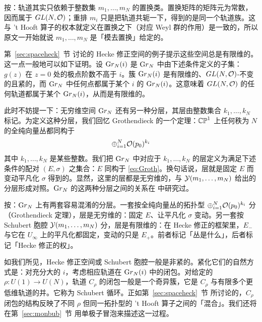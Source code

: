 \begin{yizhu}[易错点]
按：轨道其实只依赖于整数集 $m_1,\ldots,m_N$ 的置换类。置换矩阵的矩阵元为常数，因而属于 $GL(N,\cO)$；重排 $m_i$ 只是把轨道共轭一下，得到的是同一个轨道族。这与 't Hooft 算子的权本就定义在置换之下（对应 Weyl 群的作用）是一致的，所以原文一开始就说 $m_1,\ldots,m_N$ 是「模去置换」给定的。
\end{yizhu}

第~\ref{sec:spaceheck}~节 讨论的 Hecke 修正空间的例子提示这些空间总是有限维的。这一点一般地可以如下证明。设 ${\rm Gr}_N(i)$ 是 ${\rm Gr}_N$ 中由下述条件定义的子集：$g(z)$ 在 $z=0$ 处的极点阶数不高于 $i$。簇 ${\rm Gr}_N(i)$ 是有限维的、$GL(N,\cO)$-不变的且紧的，而 ${\rm Gr}_N$ 中任何点都属于某个 $i$ 的 ${\rm Gr}_N(i)$。这意味着 $GL(N,\cO)$ 的任何轨道都属于某个 ${\rm Gr}_N(i)$，从而是有限维的。

此时不妨提一下：无穷维空间 ${\rm Gr}_N$ 还有另一种分层，其层由整数集合 $k_1,\ldots,k_N$ 标记。为定义这种分层，我们回忆 Grothendieck 的一个定理：$\Bbb{CP}^1$ 上任何秩为 $N$ 的全纯向量丛都同构于 %
\setcounter{equation}{32}
\begin{equation}\label{eq:Groth}
\oplus_{i=1}^N
\cO(p_0)^{k_i}
\end{equation}
其中 $k_1,\ldots,k_N$ 是某些整数。我们把 ${\rm Gr}_N$ 中对应于 $k_1,\ldots,k_N$ 的层定义为满足下述条件的配对 $(E,\sigma)$ 之集合：$E$ 同构于 \eqref{eq:Groth}。换句话说，层就是固定 $E$ 而变动平凡化 $\sigma$ 得到的。显然，这里的层都是无穷维的，与 ${{\EUY}}(m_1,\ldots,m_N)$ 给出的分层形成对照。${\rm Gr}_N$ 的这两种分层之间的关系在 \cite{ref122} 中研究过。

\begin{yizhu}[含糊点拨]
按：${\rm Gr}_N$ 上有两套容易混淆的分层。一套按全纯向量丛的拓扑型 $\oplus_{i=1}^N\cO(p_0)^{k_i}$ 分（Grothendieck 定理），层是无穷维的：固定 $E$、让平凡化 $\sigma$ 变动。另一套按 Schubert 胞腔 ${{\EUY}}(m_1,\ldots,m_N)$ 分，层是有限维的：在 Hecke 修正的框架里，$E_-$ 与它在 $U_\infty$ 上的平凡化都固定，变动的只是 $E_+$。前者标记「丛是什么」，后者标记「Hecke 修正的权」。
\end{yizhu}

如我们所见，Hecke 修正空间或 Schubert 胞腔一般是非紧的。紧化它们的自然方式是：对充分大的 $i$，考虑相应轨道在 ${\rm Gr}_N(i)$ 中的闭包。对给定的 $\rho: U(1)\to U(N)$，轨道 $C_\rho$ 的闭包一般是一个奇异簇，它是 $C_\rho$ 与有限多个更低维轨道的并。它称为 Schubert 循环。正如第~\ref{sec:spaceheck}~节 所讨论的，$C_\rho$ 闭包的结构反映了不同 $\rho$ 但同一拓扑型的 't Hooft 算子之间的「混合」。我们还将在第~\ref{sec:monbub}~节 用单极子冒泡来描述这一过程。

